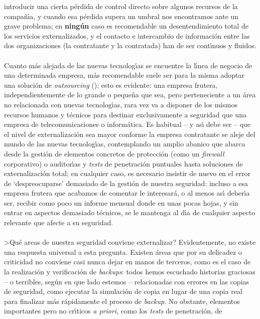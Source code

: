introducir una cierta p\'erdida de control directo sobre algunos recursos de la
compa\~n\'{\i}a, y cuando esa p\'erdida supera un umbral nos encontramos ante 
un grave problema; en {\bf ning\'un} caso es recomendable un desentendimiento
total de los servicios externalizados, y el contacto e intercambio de 
informaci\'on entre las dos organizaciones (la contratante y la contratada) han
de ser cont\'{\i}nuos y fluidos.\\
\\Cuanto m\'as alejada de las nuevas tecnolog\'{\i}as se encuentre la 
l\'{\i}nea de negocio de una determinada empresa, m\'as recomendable suele ser 
para la misma adoptar una soluci\'on de {\it outsourcing} (\cite{kn:vel02});
esto es evidente: una empresa frutera, independientemente de lo grande o 
peque\~na que sea, pero perteneciente a un \'area no relacionada con nuevas
tecnolog\'{\i}as, rara vez va a disponer de los mismos recursos humanos y 
t\'ecnicos para destinar exclusivamente a seguridad que una empresa de 
telecomunicaciones o inform\'atica. Es habitual -- y as\'{\i} debe ser -- que 
el nivel de externalizaci\'on sea mayor conforme la empresa contratante se
aleje del mundo de las nuevas tecnolog\'{\i}as, contemplando un amplio abanico
que abarca desde la gesti\'on de elementos concretos de protecci\'on (como un
{\it firewall} corporativo) o auditor\'{\i}as y {\it tests} de penetraci\'on 
puntuales hasta soluciones de externalizaci\'on total; en cualquier caso, es
necesario insistir de nuevo en el error de `despreocuparse' demasiado de la 
gesti\'on de nuestra seguridad: incluso a esa empresa frutera que acabamos de
comentar le interesar\'a, o al menos as\'{\i} deber\'{\i}a ser, recibir como
poco un informe mensual donde en unas pocas hojas, y sin entrar en aspectos
demasiado t\'ecnicos, se le mantenga al d\'{\i}a de cualquier aspecto relevante
que afecte a su seguridad.\\
\\>Qu\'e areas de nuestra seguridad conviene externalizar? Evidentemente, no
existe una respuesta universal a esta pregunta. Existen \'areas que por su
delicadez o criticidad no conviene casi nunca dejar en manos de terceros, como
es el caso de la realizaci\'on y verificaci\'on de {\it backups}: todos hemos
escuchado historias graciosas -- o terribles, seg\'un en que lado estemos -- 
relacionadas con errores en las copias de seguridad, como ejecutar la 
simulaci\'on de copia en lugar de una copia real para finalizar m\'as 
r\'apidamente el proceso de {\it backup}. No obstante, elementos importantes 
pero no cr\'{\i}ticos {\it a priori}, como los {\it tests} de penetraci\'on, de
